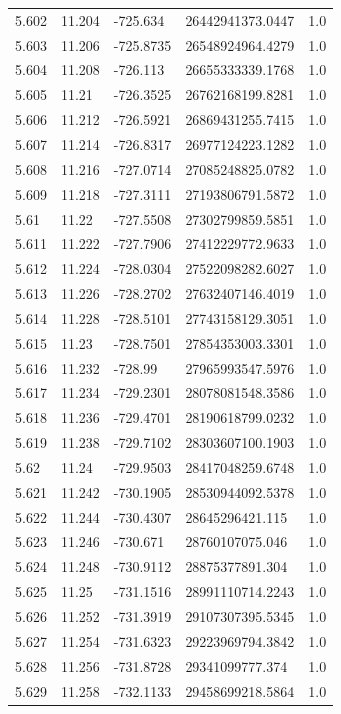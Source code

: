 \begin{tabular}{lllll}
5.602 & 11.204 & -725.634 & 26442941373.0447 & 1.0 \\
5.603 & 11.206 & -725.8735 & 26548924964.4279 & 1.0 \\
5.604 & 11.208 & -726.113 & 26655333339.1768 & 1.0 \\
5.605 & 11.21 & -726.3525 & 26762168199.8281 & 1.0 \\
5.606 & 11.212 & -726.5921 & 26869431255.7415 & 1.0 \\
5.607 & 11.214 & -726.8317 & 26977124223.1282 & 1.0 \\
5.608 & 11.216 & -727.0714 & 27085248825.0782 & 1.0 \\
5.609 & 11.218 & -727.3111 & 27193806791.5872 & 1.0 \\
5.61 & 11.22 & -727.5508 & 27302799859.5851 & 1.0 \\
5.611 & 11.222 & -727.7906 & 27412229772.9633 & 1.0 \\
5.612 & 11.224 & -728.0304 & 27522098282.6027 & 1.0 \\
5.613 & 11.226 & -728.2702 & 27632407146.4019 & 1.0 \\
5.614 & 11.228 & -728.5101 & 27743158129.3051 & 1.0 \\
5.615 & 11.23 & -728.7501 & 27854353003.3301 & 1.0 \\
5.616 & 11.232 & -728.99 & 27965993547.5976 & 1.0 \\
5.617 & 11.234 & -729.2301 & 28078081548.3586 & 1.0 \\
5.618 & 11.236 & -729.4701 & 28190618799.0232 & 1.0 \\
5.619 & 11.238 & -729.7102 & 28303607100.1903 & 1.0 \\
5.62 & 11.24 & -729.9503 & 28417048259.6748 & 1.0 \\
5.621 & 11.242 & -730.1905 & 28530944092.5378 & 1.0 \\
5.622 & 11.244 & -730.4307 & 28645296421.115 & 1.0 \\
5.623 & 11.246 & -730.671 & 28760107075.046 & 1.0 \\
5.624 & 11.248 & -730.9112 & 28875377891.304 & 1.0 \\
5.625 & 11.25 & -731.1516 & 28991110714.2243 & 1.0 \\
5.626 & 11.252 & -731.3919 & 29107307395.5345 & 1.0 \\
5.627 & 11.254 & -731.6323 & 29223969794.3842 & 1.0 \\
5.628 & 11.256 & -731.8728 & 29341099777.374 & 1.0 \\
5.629 & 11.258 & -732.1133 & 29458699218.5864 & 1.0 \\

\end{tabular}
